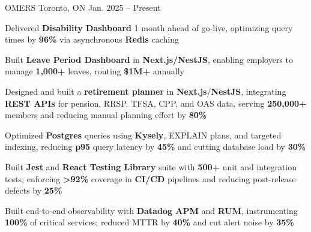 \documentclass[11pt, a4paper]{awesome-cv}
\begin{document}
\makecvheader[C]


\begin{cventries}


  \cventry
    {\color{lightblue}{ASSOCIATE FULL-STACK ENGINEER}}
    {OMERS}
    {Toronto, ON}
    {Jan. 2025 -- Present}
    {
      \begin{cvitems}
        \item{Delivered \textbf{Disability Dashboard} 1 month ahead of go-live, optimizing query times by \textbf{96\%} via asynchronous \textbf{Redis} caching}
        \item{Built \textbf{Leave Period Dashboard} in \textbf{Next.js/NestJS}, enabling employers to manage \textbf{1,000+} leaves, routing \textbf{\$1M+} annually}
        \item{Designed and built a \textbf{retirement planner} in \textbf{Next.js}/\textbf{NestJS}, integrating \textbf{REST APIs} for pension, RRSP, TFSA, CPP, and OAS data, serving \textbf{250,000+} members and reducing manual planning effort by \textbf{80\%}}
        \item{Optimized \textbf{Postgres} queries using \textbf{Kysely}, EXPLAIN plans, and targeted indexing, reducing \textbf{p95} query latency by \textbf{45\%} and cutting database load by \textbf{30\%}}
        \item{Built \textbf{Jest} and \textbf{React Testing Library} suite with \textbf{500+} unit and integration tests, enforcing \textbf{>92\%} coverage in \textbf{CI/CD} pipelines and reducing post-release defects by \textbf{25\%}}
        \item{Built end-to-end observability with \textbf{Datadog APM} and \textbf{RUM}, instrumenting \textbf{100\%} of critical services; reduced MTTR by \textbf{40\%} and cut alert noise by \textbf{35\%}}
      \end{cvitems}
    }


\end{cventries}
\end{document}
